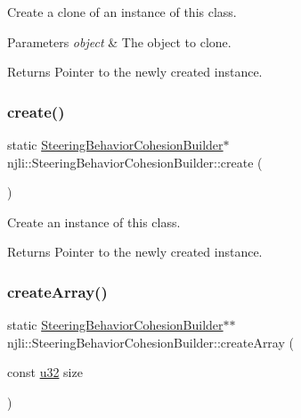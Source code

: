 Create a clone of an instance of this class.


\begin{DoxyParams}{Parameters}
{\em object} & The object to clone.\\
\hline
\end{DoxyParams}
\begin{DoxyReturn}{Returns}
Pointer to the newly created instance. 
\end{DoxyReturn}
\mbox{\label{classnjli_1_1_steering_behavior_cohesion_builder_ab6f85e6d0427c05ad846f422e92930b6}} 
\subsubsection{\texorpdfstring{create()}{create()}}
{\footnotesize\ttfamily static \mbox{\hyperlink{classnjli_1_1_steering_behavior_cohesion_builder}{Steering\+Behavior\+Cohesion\+Builder}}$\ast$ njli\+::\+Steering\+Behavior\+Cohesion\+Builder\+::create (\begin{DoxyParamCaption}{ }\end{DoxyParamCaption})\hspace{0.3cm}{\ttfamily [static]}}

Create an instance of this class.

\begin{DoxyReturn}{Returns}
Pointer to the newly created instance. 
\end{DoxyReturn}
\mbox{\label{classnjli_1_1_steering_behavior_cohesion_builder_afc983284eeaa6b00cc099d01fffb9ba9}} 
\subsubsection{\texorpdfstring{create\+Array()}{createArray()}}
{\footnotesize\ttfamily static \mbox{\hyperlink{classnjli_1_1_steering_behavior_cohesion_builder}{Steering\+Behavior\+Cohesion\+Builder}}$\ast$$\ast$ njli\+::\+Steering\+Behavior\+Cohesion\+Builder\+::create\+Array (\begin{DoxyParamCaption}\item[{const \mbox{\hyperlink{_util_8h_a10e94b422ef0c20dcdec20d31a1f5049}{u32}}}]{size }\end{DoxyParamCaption})\hspace{0.3cm}{\ttfamily [static]}}


